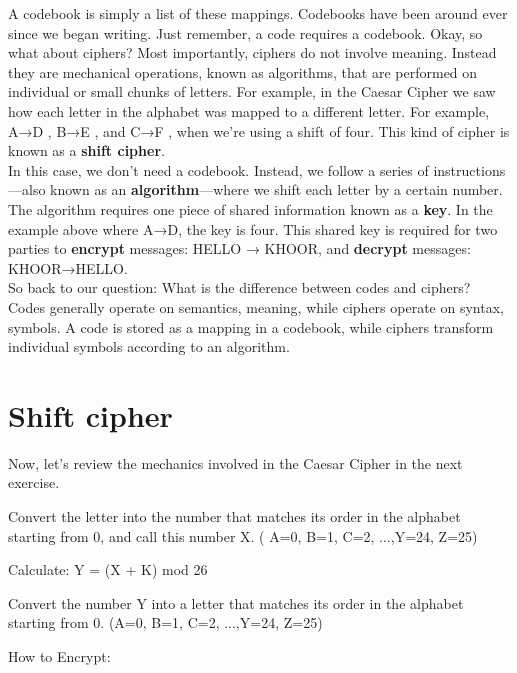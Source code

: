 \documentclass{report}
\begin{document}
A codebook is simply a list of these mappings. Codebooks have been around ever since we began writing. Just remember, a code requires a codebook.
Okay, so what about ciphers?
Most importantly, ciphers do not involve meaning. Instead they are mechanical operations, known as algorithms, that are performed on individual or small chunks of letters. For example, in the Caesar Cipher we saw how each letter in the alphabet was mapped to a different letter. For example, A→D ,  B→E , and C→F , when we're using a shift of four. This kind of cipher is known as a \textbf{shift cipher}.\\
In this case, we don’t need a codebook. Instead, we follow a series of instructions—also known as an \textbf{algorithm}—where we shift each letter by a certain number. The algorithm requires one piece of shared information known as a \textbf{key}. In the example above where A→D, the key is four. This shared key is required for two parties to \textbf{encrypt} messages: HELLO → KHOOR, and \textbf{decrypt} messages: KHOOR→HELLO.\\
So back to our question: What is the difference between codes and ciphers? Codes generally operate on semantics, meaning, while ciphers operate on syntax, symbols. A code is stored as a mapping in a codebook, while ciphers transform individual symbols according to an algorithm.
\section{Shift cipher}
Now, let’s review the mechanics involved in the Caesar Cipher in the next exercise.
\begin{algorithm}[H]
	\SetAlgoLined
	\SetNoFillComment
	\vspace{3mm}
	Convert the letter into the number that matches its order in the alphabet starting from 0, and call this number X.
	( A=0, B=1, C=2, ...,Y=24, Z=25)
	
	Calculate: Y = (X + K) mod 26
	
	Convert the number Y into a letter that matches its order in the alphabet starting from 0.
	(A=0, B=1, C=2, ...,Y=24, Z=25)
	
	\caption{How to Encrypt:}
\end{algorithm}
\end{document}
